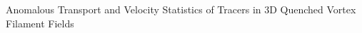 \documentclass[]{article}
\begin{document}
Anomalous Transport and Velocity Statistics of Tracers in 3D Quenched Vortex Filament Fields
\end{document}
